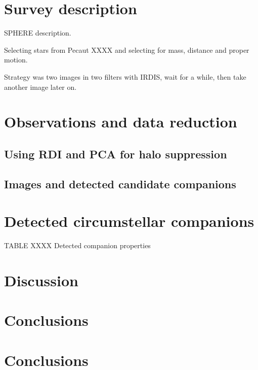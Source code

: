 \documentclass[onecolumn]{aa} %
\begin{document}
\section{Survey description}\label{sec:sample}

SPHERE description.

Selecting stars from Pecaut XXXX and selecting for mass, distance and proper motion.

Strategy was two images in two filters with IRDIS, wait for a while, then take another image later on.

\section{Observations and data reduction}\label{sec:obs}

\subsection{Using RDI and PCA for halo suppression}

\subsection{Images and detected candidate companions}

\section{Detected circumstellar companions}\label{sec:companions}

TABLE XXXX Detected companion properties

\section{Discussion}\label{sec:discuss}

\section{Conclusions}\label{sec:conc}



\section{Conclusions}\label{sec:conclusion}
\end{document}
